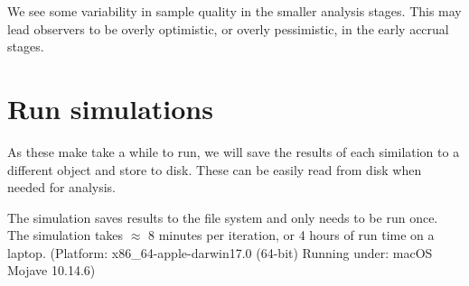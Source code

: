 \documentclass[
]{book}
\begin{document}
We see some variability in sample quality in the smaller analysis stages.
This may lead observers to be overly optimistic, or overly pessimistic,
in the early accrual stages.

\hypertarget{run-simulations}{%
\section{Run simulations}\label{run-simulations}}

As these make take a while to run,
we will save the results of each similation to a different
object and store to disk. These can be easily read from disk
when needed for analysis.

The simulation saves results to the file system and
only needs to be run once. The simulation takes \(\approx\) 8 minutes
per iteration, or 4 hours of run time on a laptop.
(Platform: x86\_64-apple-darwin17.0 (64-bit)
Running under: macOS Mojave 10.14.6)
\end{document}
